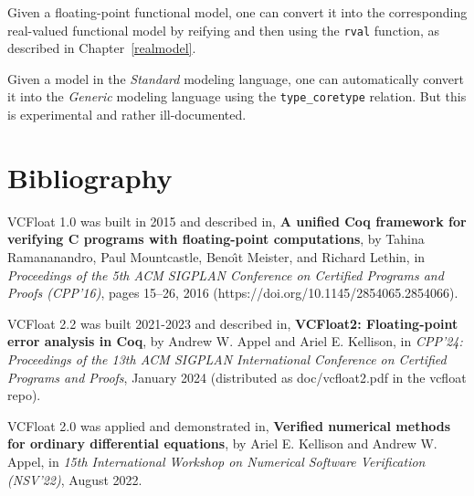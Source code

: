 \documentclass[article]{memoir}
\begin{document}
Given a floating-point functional model, one can convert it into the corresponding real-valued functional model
by reifying and then using the \lstinline{rval} function, as described in Chapter~\ref{realmodel}.

Given a model in the \emph{Standard} modeling language, one can automatically
convert it into the \emph{Generic} modeling language using the \lstinline{type_coretype}
relation.  But this is experimental and rather ill-documented.

\chapter{Bibliography}

\quad VCFloat 1.0 was built in 2015 and described in,\newline
\textbf{A unified Coq framework for verifying C programs with floating-point computations}, by Tahina Ramananandro, Paul Mountcastle, Beno\^{\i}t  Meister, and Richard Lethin, in \emph{Proceedings of the 5th ACM SIGPLAN Conference on Certified Programs and Proofs (CPP'16)}, pages 15--26, 2016 (https://doi.org/10.1145/2854065.2854066).
\vspace\baselineskip

VCFloat 2.2 was built 2021-2023 and described in,\newline
\textbf{VCFloat2: Floating-point error analysis in Coq},
by Andrew W. Appel and Ariel E. Kellison,
in \emph{CPP'24: Proceedings of the 13th ACM SIGPLAN International Conference on Certified Programs and Proofs},
January 2024 (distributed as doc/vcfloat2.pdf in the vcfloat repo).
\vspace\baselineskip

VCFloat 2.0 was applied and demonstrated in,\newline
\textbf{Verified numerical methods for ordinary differential equations},
by Ariel E. Kellison and Andrew W. Appel,
in \emph{15th International Workshop on Numerical Software Verification (NSV'22)}, August 2022.
\end{document}
